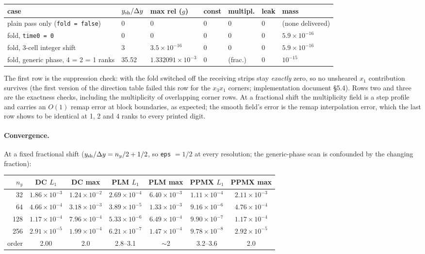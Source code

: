 \documentclass[11pt]{article}
\newcommand{\code}[1]{\texttt{#1}}
\begin{document}
\begin{center}
\small
\begin{tabular}{@{}lllllll@{}}
\toprule
case & $y_{\rm sh}/\Delta y$ & max rel ($g$) & const & multipl. & leak & mass \\
\midrule
plain pass only (\code{fold = false}) & 0 & $0$ & $0$ & $0$ & $0$ & (none delivered) \\
fold, \code{time0 = 0} & 0 & $0$ & $0$ & $0$ & $0$ & $5.9\times10^{-16}$ \\
fold, 3-cell integer shift & 3 & $3.5\times10^{-16}$ & $0$ & $0$ & $0$ & $5.9\times10^{-16}$ \\
fold, generic phase, 4 = 2 = 1 ranks & 35.52 & $1.332091\times10^{-3}$ & $0$ & (frac.) & $0$ & $10^{-15}$ \\
\bottomrule
\end{tabular}
\end{center}

The first row is the suppression check: with the fold switched off the receiving
strips stay \emph{exactly} zero, so no unsheared $x_1$ contribution survives (the first
version of the direction table failed this row for the $x_3x_1$ corners; implementation
document \S5.4). Rows two and three are the exactness checks, including the
multiplicity of overlapping corner rows. At a fractional shift the multiplicity field
is a step profile and carries an $O(1)$ remap error at block boundaries, as expected;
the smooth field's error is the remap interpolation error, which the last row shows to
be identical at 1, 2 and 4 ranks to every printed digit.

\paragraph{Convergence.} At a fixed fractional shift ($y_{\rm sh}/\Delta y = n_y/2 + 1/2$,
so \code{eps} $= 1/2$ at every resolution; the generic-phase scan is confounded by the
changing fraction):

\begin{center}
\small
\begin{tabular}{@{}rcccccc@{}}
\toprule
$n_y$ & DC $L_1$ & DC max & PLM $L_1$ & PLM max & PPMX $L_1$ & PPMX max \\
\midrule
32  & $1.86\times10^{-3}$ & $1.24\times10^{-2}$ & $2.69\times10^{-4}$ & $6.40\times10^{-3}$ & $1.11\times10^{-4}$ & $2.11\times10^{-3}$ \\
64  & $4.66\times10^{-4}$ & $3.18\times10^{-3}$ & $3.89\times10^{-5}$ & $1.33\times10^{-3}$ & $9.16\times10^{-6}$ & $4.76\times10^{-4}$ \\
128 & $1.17\times10^{-4}$ & $7.96\times10^{-4}$ & $5.33\times10^{-6}$ & $6.49\times10^{-4}$ & $9.90\times10^{-7}$ & $1.17\times10^{-4}$ \\
256 & $2.91\times10^{-5}$ & $1.99\times10^{-4}$ & $6.21\times10^{-7}$ & $1.47\times10^{-4}$ & $9.78\times10^{-8}$ & $2.92\times10^{-5}$ \\
\midrule
order & 2.00 & 2.0 & 2.8--3.1 & $\sim$2 & 3.2--3.6 & 2.0 \\
\bottomrule
\end{tabular}
\end{center}
\end{document}
